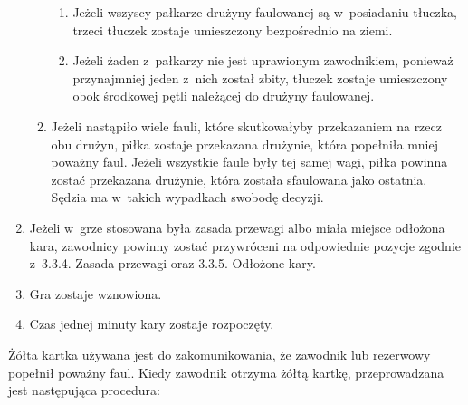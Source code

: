 \documentclass[12pt,a4paper]{article}
\renewcommand{\paragraph}[1]{
  \oldparagraph{#1}%
  \leftskip2cm
}
\begin{document}
\begin{enumerate}
\begin{enumerate}
		            \begin{enumerate}
			            \item
			                  Jeżeli wszyscy pałkarze drużyny faulowanej są w~posiadaniu
			                  tłuczka, trzeci tłuczek zostaje umieszczony bezpośrednio na ziemi.
			            \item
			                  Jeżeli żaden z~pałkarzy nie jest uprawionym zawodnikiem, ponieważ
			                  przynajmniej jeden z~nich został zbity, tłuczek zostaje
			                  umieszczony obok środkowej pętli należącej do drużyny faulowanej.
		            \end{enumerate}
		      \item
		            Jeżeli nastąpiło wiele fauli, które skutkowałyby przekazaniem na
		            rzecz obu drużyn, piłka zostaje przekazana drużynie, która popełniła
		            mniej poważny faul. Jeżeli wszystkie faule były tej samej wagi,
		            piłka powinna zostać przekazana drużynie, która została sfaulowana
		            jako ostatnia. Sędzia ma w~takich wypadkach swobodę decyzji.
	      \end{enumerate}
	\item
	      Jeżeli w~grze stosowana była zasada przewagi albo miała miejsce
	      odłożona kara, zawodnicy powinny zostać przywróceni na odpowiednie
	      pozycje zgodnie z~3.3.4. Zasada przewagi oraz 3.3.5. Odłożone kary.
	\item
	      Gra zostaje wznowiona.
	\item
	      Czas jednej minuty kary zostaje rozpoczęty.
\end{enumerate}

\paragraph{Żółta kartka}
Żółta kartka używana jest do
zakomunikowania, że zawodnik lub rezerwowy popełnił poważny faul. Kiedy
zawodnik otrzyma żółtą kartkę, przeprowadzana jest następująca
procedura:
\end{document}
